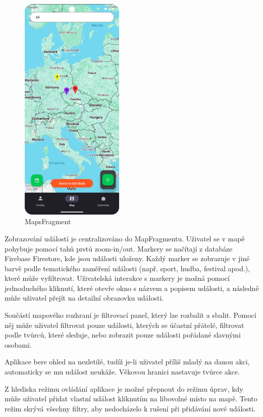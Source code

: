 \begin{figure}[H]
    \centering
    \includegraphics[height=11cm]{Images/MapsFrag.png}
    \caption{MapsFragment}
    \label{fig:Update-account}
\end{figure}

Zobrazování událostí je centralizováno do MapFragmentu. Uživatel se v mapě pohybuje pomocí tahů prstů zoom-in/out. Markery se načítají z databáze Firebase Firestore, kde jsou události uloženy. Každý marker se zobrazuje v jiné barvě podle tematického zaměření události (např. sport, hudba, festival apod.), které může vyfiltrovat. Uživatelská interakce s markery je možná pomocí jednoduchého kliknutí, které otevře okno s názvem a popisem události, a následně může uživatel přejít na detailní obrazovku události.

Součástí mapového rozhraní je filtrovací panel, který lze rozbalit a sbalit. Pomocí něj může uživatel filtrovat pouze události, kterých se účastní přátelé, filtrovat podle tvůrců, které sleduje, nebo zobrazit pouze události pořádané slavnými osobami.


Aplikace bere ohled na nezletilé, tudíž je-li uživatel příliš mladý na danou akci, automaticky se mu událost neukáže. Věkovou hranici nastavuje tvůrce akce. 

Z hlediska režimu ovládání aplikace je možné přepnout do režimu úprav, kdy může uživatel přidat vlastní událost kliknutím na libovolné místo na mapě. Tento režim skrývá všechny filtry, aby nedocházelo k rušení při přidávání nové události.

